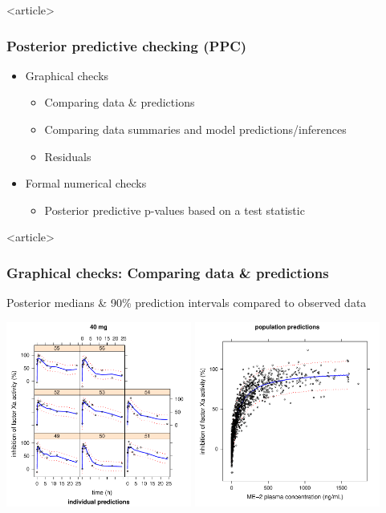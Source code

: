 \documentclass{beamer}
\begin{document}
\begin{frame}<article>
  \frametitle{Posterior predictive checking (PPC)}
  
  \begin{itemize}
  \item Graphical checks
    \begin{itemize}
    \item Comparing data \& predictions
    \item Comparing data summaries and model predictions/inferences
    \item Residuals
    \end{itemize}
  \item Formal numerical checks
    \begin{itemize}
    \item Posterior predictive p-values based on a test statistic
    \end{itemize}
  \end{itemize}

\end{frame}

\begin{frame}<article>
  \frametitle{Graphical checks: Comparing data \& predictions}
  
    Posterior medians \& 90\% prediction intervals compared to
    observed data
  \begin{center}
    \includegraphics[width=2.4in,trim=0.2in 0 0
    0,clip]{graphics/me2HandsOn2Plots011.pdf}
    \includegraphics[width=2.4in,trim=0.2in 0 0
    0,clip]{graphics/me2HandsOn2Plots024.pdf}
  \end{center}

\end{frame}
\end{document}
